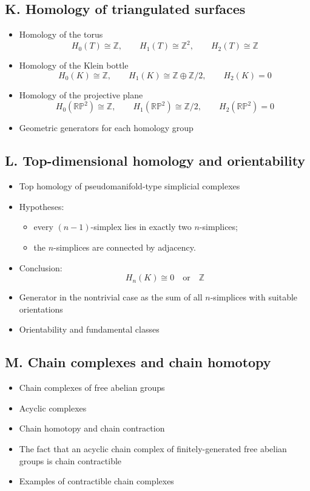 \documentclass[12pt,a4paper]{article}
\theoremstyle{notespace}
\begin{document}
	\subsection*{K. Homology of triangulated surfaces}
	\begin{itemize}
		\item Homology of the torus
		\[
		H_0(T)\cong \mathbb Z,\qquad
		H_1(T)\cong \mathbb Z^2,\qquad
		H_2(T)\cong \mathbb Z
		\]
		\item Homology of the Klein bottle
		\[
		H_0(K)\cong \mathbb Z,\qquad
		H_1(K)\cong \mathbb Z\oplus \mathbb Z/2,\qquad
		H_2(K)=0
		\]
		\item Homology of the projective plane
		\[
		H_0(\mathbb{RP}^2)\cong \mathbb Z,\qquad
		H_1(\mathbb{RP}^2)\cong \mathbb Z/2,\qquad
		H_2(\mathbb{RP}^2)=0
		\]
		\item Geometric generators for each homology group
	\end{itemize}
	
	\subsection*{L. Top-dimensional homology and orientability}
	\begin{itemize}
		\item Top homology of pseudomanifold-type simplicial complexes
		\item Hypotheses:
		\begin{itemize}
			\item every \((n-1)\)-simplex lies in exactly two \(n\)-simplices;
			\item the \(n\)-simplices are connected by adjacency.
		\end{itemize}
		\item Conclusion:
		\[
		H_n(K)\cong 0 \quad\text{or}\quad \mathbb Z
		\]
		\item Generator in the nontrivial case as the sum of all \(n\)-simplices with suitable orientations
		\item Orientability and fundamental classes
	\end{itemize}
	
	\subsection*{M. Chain complexes and chain homotopy}
	\begin{itemize}
		\item Chain complexes of free abelian groups
		\item Acyclic complexes
		\item Chain homotopy and chain contraction
		\item The fact that an acyclic chain complex of finitely-generated free abelian groups is chain contractible
		\item Examples of contractible chain complexes
	\end{itemize}
	
\end{document}
